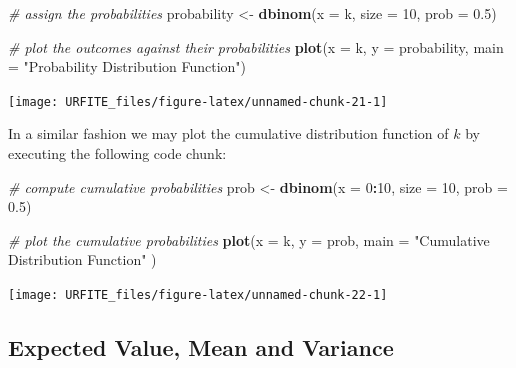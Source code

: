 \documentclass[]{book}
\newenvironment{Shaded}{\begin{snugshade}}{\end{snugshade}}
\newcommand{\KeywordTok}[1]{\textcolor[rgb]{0.13,0.29,0.53}{\textbf{#1}}}
\newcommand{\DataTypeTok}[1]{\textcolor[rgb]{0.13,0.29,0.53}{#1}}
\newcommand{\DecValTok}[1]{\textcolor[rgb]{0.00,0.00,0.81}{#1}}
\newcommand{\FloatTok}[1]{\textcolor[rgb]{0.00,0.00,0.81}{#1}}
\newcommand{\StringTok}[1]{\textcolor[rgb]{0.31,0.60,0.02}{#1}}
\newcommand{\CommentTok}[1]{\textcolor[rgb]{0.56,0.35,0.01}{\textit{#1}}}
\newcommand{\OperatorTok}[1]{\textcolor[rgb]{0.81,0.36,0.00}{\textbf{#1}}}
\newcommand{\NormalTok}[1]{#1}
\theoremstyle{definition}
\theoremstyle{definition}
\theoremstyle{definition}
\theoremstyle{remark}
\begin{document}
\begin{Shaded}
\begin{Highlighting}[]
\CommentTok{# assign the probabilities}
\NormalTok{probability <-}\StringTok{ }\KeywordTok{dbinom}\NormalTok{(}\DataTypeTok{x =}\NormalTok{ k,}
                      \DataTypeTok{size =} \DecValTok{10}\NormalTok{, }
                      \DataTypeTok{prob =} \FloatTok{0.5}\NormalTok{)}

\CommentTok{# plot the outcomes against their probabilities}
\KeywordTok{plot}\NormalTok{(}\DataTypeTok{x =}\NormalTok{ k, }
     \DataTypeTok{y =}\NormalTok{ probability,}
     \DataTypeTok{main =} \StringTok{"Probability Distribution Function"}\NormalTok{) }
\end{Highlighting}
\end{Shaded}

\begin{center}\texttt{[image: URFITE\_files/figure-latex/unnamed-chunk-21-1]} \end{center}

In a similar fashion we may plot the cumulative distribution function of
\(k\) by executing the following code chunk:

\begin{Shaded}
\begin{Highlighting}[]
\CommentTok{# compute cumulative probabilities}
\NormalTok{prob <-}\StringTok{ }\KeywordTok{dbinom}\NormalTok{(}\DataTypeTok{x =} \DecValTok{0}\OperatorTok{:}\DecValTok{10}\NormalTok{, }
               \DataTypeTok{size =} \DecValTok{10}\NormalTok{, }
               \DataTypeTok{prob =} \FloatTok{0.5}\NormalTok{)}

\CommentTok{# plot the cumulative probabilities}
\KeywordTok{plot}\NormalTok{(}\DataTypeTok{x =}\NormalTok{ k, }
     \DataTypeTok{y =}\NormalTok{ prob,}
     \DataTypeTok{main =} \StringTok{"Cumulative Distribution Function"}
\NormalTok{     ) }
\end{Highlighting}
\end{Shaded}

\begin{center}\texttt{[image: URFITE\_files/figure-latex/unnamed-chunk-22-1]} \end{center}

\subsection*{Expected Value, Mean and
Variance}\label{expected-value-mean-and-variance}
\end{document}
